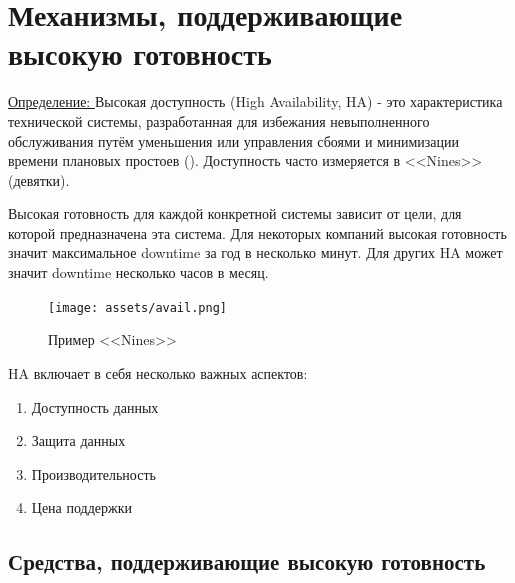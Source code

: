 \section{Механизмы, поддерживающие высокую готовность}

\underline{Определение: } Высокая доступность (High Availability, HA) - это характеристика технической системы, разработанная для избежания невыполненного обслуживания путём уменьшения или управления сбоями и минимизации времени плановых простоев (\autocite{WikiHA}). Доступность часто измеряется в <<Nines>> (девятки).

Высокая готовность для каждой конкретной системы зависит от цели, для которой предназначена эта система. Для некоторых компаний высокая готовность значит максимальное downtime за год в несколько минут. Для других HA может значит downtime несколько часов в месяц.
\begin{figure}[h]
    \centering
    \texttt{[image: assets/avail.png]}
    \caption{Пример <<Nines>>}
    \label{fig:mesh1}
\end{figure}

HA включает в себя несколько важных аспектов:
\begin{enumerate}
    \item Доступность данных 
    \item Защита данных
    \item Производительность
    \item Цена поддержки
\end{enumerate}

\subsection{Средства, поддерживающие высокую готовность}
